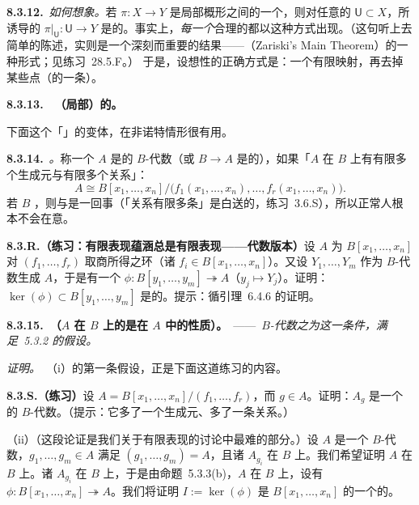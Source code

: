 \textbf{8.3.12.}\ \emph{如何想象\trQuasifinite{}\trMorphism。}\quad 若 $\pi\colon X\to Y$ 是局部\trNoetherian{}概形之间的一个\trFinite{}\trMorphism，则对任意\trQuasicompact{}的\trOpenSubset{} $\mathsf{U}\subset X$，所诱导的\trMorphism{} $\pi|_{\mathsf{U}}\colon\mathsf{U}\to Y$ 是\trQuasifinite{}的。事实上，\emph{每一个}合理的\trQuasifinite{}\trMorphism{}都以这种方式出现。（这句听上去简单的陈述，实则是一个深刻而重要的结果——\trZariskiMainTheorem{}（Zariski's Main Theorem）的一种形式；见\mbox{练习~28.5.F}。）
于是，设想\trQuasifinite{}性的正确方式是：一个有限映射，再去掉某些点（的一条\trClosed\trLocus）。

\textbf{8.3.13.}\ \extrahard\ \textbf{（局部）\trFinitelyPresented{}的\trMorphism。}

下面这个「\trLocally\trFiniteType」的变体，在非诺特情形很有用。

\textbf{8.3.14.}\ \emph{\trhDefinition{}。}\quad 称一个\trRing{} $A$ 是\trFinitelyPresented{}的 $B$-代数（或 $B\to A$ 是\trFinitelyPresented{}的），如果「$A$ 在 $B$ 上有有限多个生成元与有限多个关系」：
\[
A\cong B[x_1,\dots,x_n]\big/\bigl(f_1(x_1,\dots,x_n),\dots,f_r(x_1,\dots,x_n)\bigr).
\]
若 $B$ \trNoetherian，则\trFinitelyPresented{}与\trFiniteType{}是一回事（「关系有限多条」是白送的，练习~3.6.S），所以正常人根本不会在意。

\textbf{8.3.R.（练习：有限表现蕴涵总是有限表现——代数版本）}\quad 设 $A$ 为 $B[x_1,\dots,x_n]$ 对\trIdeal{} $(f_1,\dots,f_r)$ 取商所得之环（诸 $f_i\in B[x_1,\dots,x_n]$）。又设 $Y_1,\dots,Y_m$ 作为 $B$-代数生成 $A$，于是有一个\trSurjectiveMap{} $\phi\colon B[y_1,\dots,y_m]\twoheadrightarrow A$（$y_j\mapsto Y_j$）。证明：\trIdeal{} $\ker(\phi)\subset B[y_1,\dots,y_m]$ 是\trFinitelyGenerated{}的。提示：循引理~6.4.6 的证明。

\textbf{8.3.15.\ \trhLemma{}（$A$ 在 $B$ 上的\trFinitelyPresented{}是在 $A$ 中\trAffineLocal{}的性质）。}\ ——\ \emph{$B$-代数之为\trFinitelyPresented{}这一条件，满足\trAffineCommunicationLemma{}~5.3.2 的假设。}

\emph{证明。}\ （i）\trAffineCommunicationLemma{}的第一条假设，正是下面这道练习的内容。

\textbf{8.3.S.（练习）}\quad 设 $A=B[x_1,\dots,x_n]/(f_1,\dots,f_r)$，而 $g\in A$。证明：$A_g$ 是一个\trFinitelyPresented{}的 $B$-代数。（提示：它多了一个生成元、多了一条关系。）

（ii）（这段论证是我们关于有限表现的讨论中最难的部分。）设 $A$ 是一个 $B$-代数，$g_1,\dots,g_m\in A$ 满足 $(g_1,\dots,g_m)=A$，且诸 $A_{g_i}$ 在 $B$ 上\trFinitelyPresented。我们希望证明 $A$ 在 $B$ 上\trFinitelyPresented。诸 $A_{g_i}$ 在 $B$ 上\trFinitelyGenerated，于是由命题~5.3.3(b)，$A$ 在 $B$ 上\trFinitelyGenerated，设有\trSurjectiveMap{} $\phi\colon B[x_1,\dots,x_n]\twoheadrightarrow A$。我们将证明 $I:=\ker(\phi)$ 是 $B[x_1,\dots,x_n]$ 的一个\trFinitelyGenerated{}的\trIdeal。

